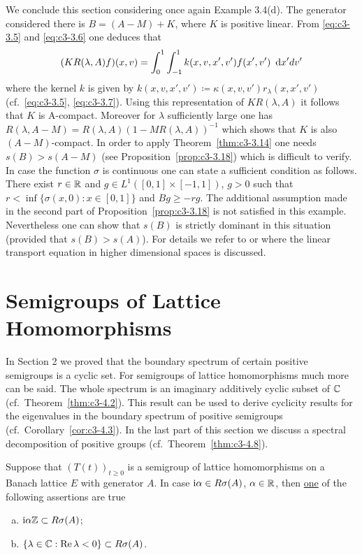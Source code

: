 We conclude this section considering once again Example 3.4(d).
The generator considered there is $B = (A - M) + K$, where $K$ is
%
positive linear. 
From \eqref{eq:c3-3.5} and \eqref{eq:c3-3.6} one deduces that 
\[
(KR(\lambda,A)f)(x,v) = \int_{0}^{1}\int_{-1}^{1} k(x,v,x',v')f(x',v')~\mathop{}\!\mathrm{d}{x}'dv'
\]
where the kernel $k$ is given by $k(x,v,x',v') \coloneqq  \kappa(x,v,v')r_{\lambda}(x,x',v')$ (cf.\ \eqref{eq:c3-3.5}, \eqref{eq:c3-3.7}). 
Using this representation of $KR(\lambda,A)$ it follows that $K$ is A-compact. 
Moreover for $\lambda$ sufficiently large one has $R(\lambda,A-M) = R(\lambda,A)(1 - MR(\lambda,A))^{-1}$ which shows that $K$ is also $(A-M)$-compact. 
In order to apply Theorem~\ref{thm:c3-3.14} one needs $s(B) > s(A-M)$ (see Proposition~\ref{prop:c3-3.18}) which is difficult to verify. 
In case the function $\sigma$ is continuous one can state a sufficient condition as follows.
There exist $r \in \mathbb{R} $ and $g \in L^{1}([0,1]\times[-1,1])$, $g > 0$ such that $r < \inf\{\sigma(x,0) : x \in [0,1]\}$ and $Bg \geq -rg$.
The additional assumption made in the second part of Proposition~\ref{prop:c3-3.18} is not satisfied in this example. 
Nevertheless one can show that $s(B)$ is strictly dominant in this situation (provided that $s(B) > s(A)$). 
For details we refer to 
\marginpar{[Greiner (1984d)]}
\citet{greiner:1984d}  or \citet{voigt:1985} where the linear transport equation in higher dimensional spaces is discussed.

\section{Semigroups of Lattice Homomorphisms}\label{sec:c3-4}

In Section 2 we proved that the boundary spectrum of certain positive semigroups is a cyclic set. 
For semigroups of lattice homomorphisms much more can be said. The whole spectrum is an imaginary additively cyclic subset of $\mathbb{C} $ (cf.\ Theorem~\ref{thm:c3-4.2}). 
This result can be used to derive cyclicity results for the eigenvalues in the boundary spectrum of positive semigroups (cf.\ Corollary~\ref{cor:c3-4.3}). 
In the last part of this section we discuss a spectral decomposition of positive groups (cf.\ Theorem~\ref{thm:c3-4.8}).

\begin{lemma}\label{lem:c3-4.1}
	Suppose that $(T(t))_{t \ge 0}$ is a semigroup of lattice homomorphisms on a Banach lattice $E$ with generator $A$.
	In case $\mathrm{i}\alpha \in R\sigma(A)$, $\alpha \in \mathbb{R} $, then \underline{one} of the following assertions are true
	\begin{enumerate}[(a)]
		\item $\mathrm{i}\alpha\mathbb{Z} \subset R\sigma(A)$;
		\item $\{\lambda \in \mathbb{C}  : \mathop{}\!\mathrm{Re}\,\lambda < 0 \} \subset R\sigma(A)$.
	\end{enumerate}
\end{lemma}

